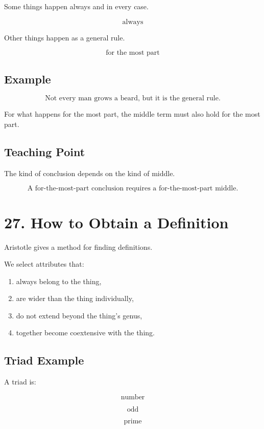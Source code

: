 \documentclass[12pt]{article}
\begin{document}
Some things happen always and in every case.

\[
\text{always}
\]

Other things happen as a general rule.

\[
\text{for the most part}
\]

\subsection*{Example}

\[
\text{Not every man grows a beard, but it is the general rule.}
\]

For what happens for the most part, the middle term must also hold for the most
part.

\subsection*{Teaching Point}

The kind of conclusion depends on the kind of middle.

\[
\boxed{
\text{A for-the-most-part conclusion requires a for-the-most-part middle.}
}
\]

\section*{27. How to Obtain a Definition}

Aristotle gives a method for finding definitions.

We select attributes that:

\begin{enumerate}[itemsep=0.25em]
    \item always belong to the thing,
    \item are wider than the thing individually,
    \item do not extend beyond the thing's genus,
    \item together become coextensive with the thing.
\end{enumerate}

\subsection*{Triad Example}

A triad is:

\[
\text{number}
\]

\[
\text{odd}
\]

\[
\text{prime}
\]
\end{document}
